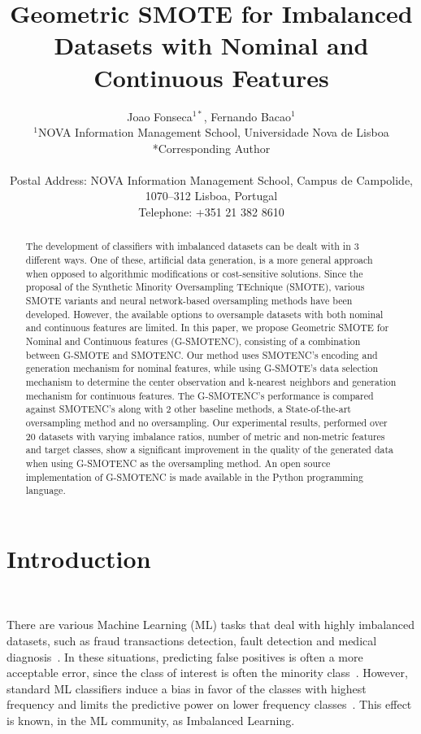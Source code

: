 \documentclass[parskip=full]{scrartcl}
\title{Geometric SMOTE for Imbalanced Datasets with Nominal and Continuous Features}
\author{%
	Joao Fonseca\(^{1*}\), Fernando Bacao\(^{1}\)
	\\
	\small{\(^{1}\)NOVA Information Management School, Universidade Nova de Lisboa}
	\\
	\small{*Corresponding Author}
	\\
	\\
	\small{Postal Address: NOVA Information Management School, Campus de
    Campolide, 1070--312 Lisboa, Portugal}
	\\
	\small{Telephone: +351 21 382 8610}
}
\date{}
\begin{document}
\maketitle

\begin{abstract}

    The development of classifiers with imbalanced datasets can be dealt with
    in 3 different ways. One of these, artificial data generation, is a more
    general approach when opposed to algorithmic modifications or
    cost-sensitive solutions. Since the proposal of the Synthetic Minority
    Oversampling TEchnique (SMOTE), various SMOTE variants and neural
    network-based oversampling methods have been developed. However, the
    available options to oversample datasets with both nominal and continuous
    features are limited. In this paper, we propose Geometric SMOTE for
    Nominal and Continuous features (G-SMOTENC), consisting of a combination
    between G-SMOTE and SMOTENC. Our method uses SMOTENC's encoding and
    generation mechanism for nominal features, while using G-SMOTE's data
    selection mechanism to determine the center observation and k-nearest
    neighbors and generation mechanism for continuous features. The
    G-SMOTENC's performance is compared against SMOTENC's along with 2 other
    baseline methods, a State-of-the-art oversampling method and no
    oversampling. Our experimental results, performed over 20 datasets with
    varying imbalance ratios, number of metric and non-metric features and
    target classes, show a significant improvement in the quality of the
    generated data when using G-SMOTENC as the oversampling method. An open
    source implementation of G-SMOTENC is made available in the Python
    programming language.

\end{abstract}

\section{Introduction}~\label{sec:introduction}

There are various Machine Learning (ML) tasks that deal with highly imbalanced
datasets, such as fraud transactions detection, fault detection and medical
diagnosis~\cite{tyagi2020sampling}. In these situations, predicting false
positives is often a more acceptable error, since the class of interest is
often the minority class~\cite{vuttipittayamongkol2021class}. However,
standard ML classifiers induce a bias in favor of the classes with highest
frequency and limits the predictive power on lower frequency
classes~\cite{lopez2013insight, das2018handling}. This effect is known, in the
ML community, as Imbalanced Learning. 
\end{document}
